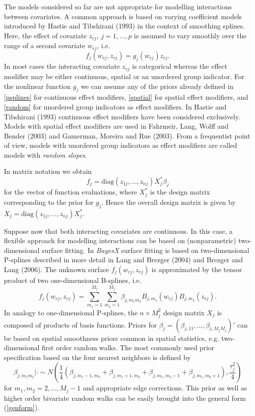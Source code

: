 \documentclass[11pt,a4paper,twoside]{bayesxarticle}
\newcommand{\diag}{\mbox{diag}}
\begin{document}
The models considered so far are not appropriate for modelling
interactions between covariates. A common approach is based on
varying coefficient models introduced by Hastie and Tibshirani
(1993) in the context of smoothing splines. Here, the effect of
covariate $z_{rj}$, $j=1,\dots,p$ is assumed to vary smoothly over
the range of a second covariate $w_{rj}$, i.e.
\begin{equation}
\label{varcoeffterm} f_j(w_{rj},z_{rj}) = g_j(w_{rj}) z_{rj}.
\end{equation}
In most cases the interacting covariate $z_{rj}$ is categorical
whereas the effect modifier may be either continuous, spatial or an
unordered group indicator. For the nonlinear function $g_j$ we can
assume any of the priors already defined in \autoref{psplines} for
continuous effect modifiers, \autoref{spatial} for spatial effect
modifiers, and \autoref{random} for unordered group indicators as
effect modifiers. In Hastie and Tibshirani (1993) continuous effect
modifiers have been considered exclusively. Models with spatial
effect modifiers are used in Fahrmeir, Lang, Wolff and Bender (2003)
and Gamerman, Moreira and Rue (2003). From a frequentist point of
view, models with unordered group indicators as effect modifiers are
called models with {\em random slopes}.

In matrix notation we obtain
$$
f_j = \diag(z_{1j},\dots,z_{nj})  X_j^* \beta_j
$$
for the vector of function evaluations, where $X_j^*$ is the design
matrix corresponding to the prior for $g_j$. Hence the overall
design matrix is given by $X_j = \diag(z_{1j},\dots,z_{nj})  X_j^*$.

Suppose now that both interacting covariates are continuous. In this
case, a flexible approach for modelling interactions can be based on
(nonparametric) two-dimensional surface fitting. In {\em BayesX}
surface fitting is based on two-dimensional P-splines described in
more detail in Lang and Brezger (2004) and Brezger and Lang (2006).
The unknown surface $f_j(w_{rj},z_{rj})$ is approximated by the
tensor product of two one-dimensional B-splines, i.e.
$$
f_{j}(w_{rj},z_{rj}) = \sum_{m_1=1}^{M_j} \sum_{m_2=1}^{M_j}
\beta_{j,m_1 m_2} B_{j, m_1}(w_{rj}) B_{j,m_2} (z_{rj}).
$$
In analogy to one-dimensional P-splines, the $n \times M_j^2$ design
matrix $X_j$ is composed of products of basis functions. Priors for
$\beta_{j} = (\beta_{j,11},\dots,\beta_{j,M_jM_j})'$ can be based on
spatial smoothness priors common in spatial statistics, e.g.
two-dimensional first order random walks. The most commonly used
prior specification based on the four nearest neighbors is defined
by
\begin{equation}
\label{2dimrw1} \beta_{j, m_1 m_2} | \cdot \sim N \left(
\frac{1}{4} ( \beta_{j, m_1-1,m_2}+ \beta_{j, m_1+1,m_2} +
\beta_{j, m_1,m_2-1} +\beta_{j, m_1,m_2+1}),\frac{\tau^2_{j}}{4}
\right)
\end{equation}
for $m_1,m_2=2,\dots,M_j-1$ and appropriate edge corrections. This
prior as well as higher order bivariate random walks can be easily
brought into the general form (\ref{genform}).
\end{document}
